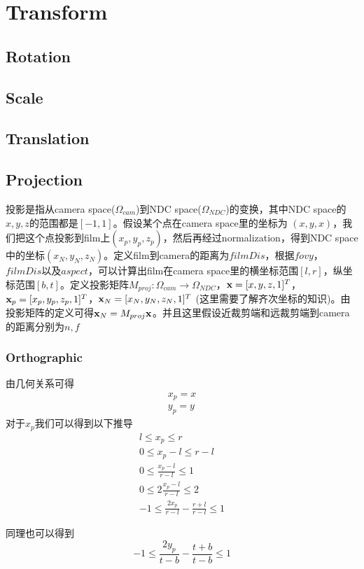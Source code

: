 \section{Transform}
\subsection{Rotation}
\subsection{Scale}
\subsection{Translation}
\subsection{Projection}
投影是指从camera space($\Omega_{cam}$)到NDC space($\Omega_{NDC}$)的变换，其中NDC space的$x,y,z$的范围都是$[-1,1]$。假设某个点在camera space里的坐标为 $(x,y,x)$，我们把这个点投影到film上$(x_p,y_p,z_p)$，然后再经过normalization，得到NDC space中的坐标$(x_N, y_N,z_N)$。定义film到camera的距离为$filmDis$，根据$fovy$，$filmDis$以及$aspect$，可以计算出film在camera space里的横坐标范围$[l,r]$，纵坐标范围$[b,t]$。定义投影矩阵$M_{proj}: \Omega_{cam}\to \Omega_{NDC}$，$\bold{x} = [x, y, z, 1]^T$，$\bold{x}_p = [x_p, y_p, z_p, 1]^T$，$\bold{x}_N = [x_N, y_N, z_N, 1]^T$ (这里需要了解齐次坐标的知识)。由投影矩阵的定义可得$\bold{x}_N = M_{proj}\bold{x}$。并且这里假设近裁剪端和远裁剪端到camera的距离分别为$n,f$
\subsubsection{Orthographic}
由几何关系可得
\begin{gather*}
x_p = x\\
y_p = y
\end{gather*}
对于$x_p$我们可以得到以下推导
\begin{gather*}
l \leq x_p \leq r\\
0 \leq x_p - l \leq r-l\\
0 \leq \frac{x_p - l}{r - l} \leq 1\\
0 \leq 2\frac{x_p - l}{r - l} \leq 2\\
-1 \leq \frac{2 x_p}{r-l} - \frac{r + l}{r - l} \leq 1
\end{gather*}

同理也可以得到
\begin{displaymath}
-1 \leq \frac{2y_p}{t - b} - \frac{t + b}{t - b} \leq 1
\end{displaymath}
\\

